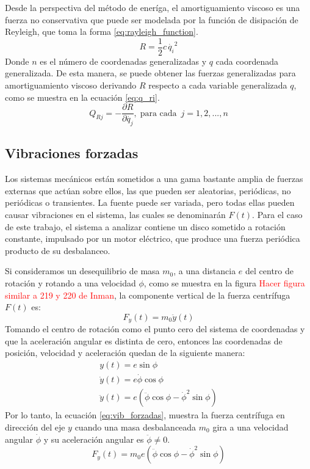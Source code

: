 Desde la perspectiva del método de eneríga, el amortiguamiento viscoso es una fuerza no conservativa que puede ser modelada por la función de disipación de Reyleigh, que toma la forma \ref{eq:rayleigh_function}.
\begin{equation}\label{eq:rayleigh_function}
	R = \frac{1}{2}c\,\dot{q_i}^2
\end{equation} 
Donde $n$ es el número de coordenadas generalizadas y $q$ cada coordenada generalizada. De esta manera, se puede obtener las fuerzas generalizadas para amortiguamiento viscoso derivando $R$ respecto a cada variable generalizada $q$, como se muestra en la ecuación \ref{eq:q_ri}.
\begin{equation}\label{eq:q_ri}
	Q_{Rj} = -\frac{\partial R}{\partial \dot{q_j}}, \; \text{para cada }\, j=1,2,...,n
\end{equation}

\subsection{Vibraciones forzadas}
\label{sec:vib_forzadas}
Los sistemas mecánicos están sometidos a una gama bastante amplia de fuerzas externas que actúan sobre ellos, las que pueden ser aleatorias, periódicas, no periódicas o transientes. La fuente puede ser variada, pero todas ellas pueden causar vibraciones en el sistema, las cuales se denominarán $F(t)$. Para el caso de este trabajo, el sistema a analizar contiene un disco sometido a rotación constante, impulsado por un motor eléctrico, que produce una fuerza periódica producto de su desbalanceo.

Si consideramos un desequilibrio de masa $m_0$, a una distancia $e$ del centro de rotación y rotando a una velocidad $\phi$, como se muestra en la figura \textcolor{red}{Hacer figura similar a 219 y 220 de Inman}, la componente vertical de la fuerza centrífuga $F(t)$ es:
\begin{equation}
	F_y(t) = m_0\ddot{y}(t)
\end{equation}
Tomando el centro de rotación como el punto cero del sistema de coordenadas y que la aceleración angular es distinta de cero, entonces las coordenadas de posición, velocidad y aceleración quedan de la siguiente manera:
\begin{gather*}
	y(t) = e \sin \phi\\
	\dot{y}(t) = e \dot{\phi}\cos \phi\\
	\ddot{y}(t) = e(\ddot{\phi}\cos\phi - \dot{\phi}^2\sin\phi)
\end{gather*}
Por lo tanto, la ecuación \ref{eq:vib_forzadas}, muestra la fuerza centrífuga en dirección del eje $y$ cuando una masa desbalanceada $m_0$ gira a una velocidad angular $\dot{\phi}$ y su aceleración angular es $\ddot{\phi} \neq 0$.
\begin{equation}\label{eq:vib_forzadas}
	F_y(t) = m_0e(\ddot{\phi}\cos\phi- \dot{\phi}^2\sin\phi)
\end{equation}

